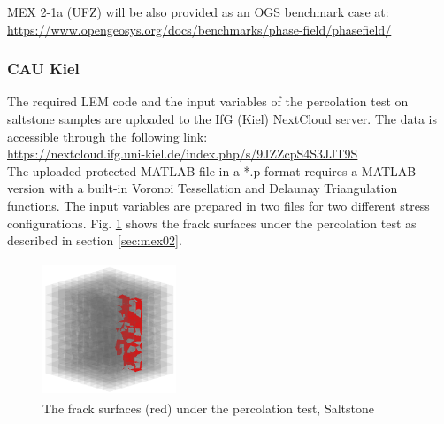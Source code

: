 MEX 2-1a (UFZ) will be also provided as an OGS benchmark case at:\\
\small
\url{https://www.opengeosys.org/docs/benchmarks/phase-field/phasefield/}
\normalsize

\subsubsection*{CAU Kiel}

The required LEM code and the input variables of the percolation test on saltstone samples are uploaded to the IfG (Kiel) NextCloud server. The data is accessible through the following link:\\
\hyperlink{https://nextcloud.ifg.uni-kiel.de/index.php/s/9JZZcpS4S3JJT9S}{https://nextcloud.ifg.uni-kiel.de/index.php/s/9JZZcpS4S3JJT9S}\\

The uploaded protected MATLAB file in a *.p format requires a MATLAB version with a built-in Voronoi Tessellation and Delaunay Triangulation functions. The input variables are prepared in two files for two different stress configurations. Fig. \ref{fig:Amir_ME2_LEM_b_model_Fracture_Data} shows the frack surfaces under the percolation test as described in section \ref {sec:mex02}.

\begin{figure}[!ht]
\centering
\includegraphics[width=4cm,height=4cm]{figures/Amir_ME2_LEM_b_model_Fracture_Data.png}
\caption{The frack surfaces (red) under the percolation test, Saltstone}
\label{fig:Amir_ME2_LEM_b_model_Fracture_Data}
\end{figure}

